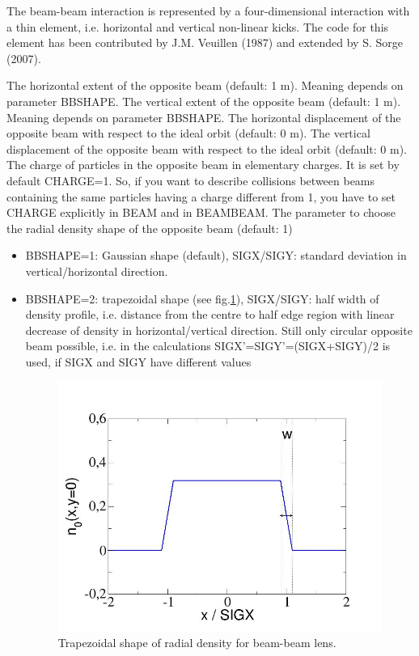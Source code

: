The beam-beam interaction is represented by a four-dimensional
interaction with a thin element, i.e. horizontal and vertical non-linear kicks.
The code for this element has been contributed by J.M. Veuillen (1987)
and extended by S. Sorge (2007).  
 
\begin{madlist}
     The horizontal extent of the opposite beam (default: 1 m).
     Meaning depends on parameter BBSHAPE.
     The vertical extent of the opposite beam (default: 1 m).
     Meaning depends on parameter BBSHAPE.
     The horizontal displacement of the opposite beam with respect to
     the ideal orbit (default: 0 m).
     The vertical displacement of the opposite beam with respect to
     the ideal orbit (default: 0 m).
     The charge of particles in the opposite beam in elementary charges. 
     It is set by default CHARGE=1. So, if you want to describe collisions 
     between beams containing the same particles having a charge different 
     from 1, you have to set CHARGE explicitly in BEAM and 
     in BEAMBEAM. 
    The parameter to choose the radial density shape of the 
     opposite beam (default: 1)
     \begin{itemize}
       \item  BBSHAPE=1: Gaussian shape (default), SIGX/SIGY: standard deviation in 
         vertical/horizontal direction.
	\item  BBSHAPE=2: trapezoidal shape (see fig.\ref{fig:beambeam_n_trapez}), 
          SIGX/SIGY: half width of density profile,
          i.e. distance from the centre to half edge region with linear decrease of 
          density in horizontal/vertical direction. Still only circular opposite beam 
          possible, i.e. in the calculations 
          SIGX'=SIGY'=(SIGX+SIGY)/2 is used, if SIGX and SIGY have
          different values 

\begin{figure}[h]
  \begin{center}
    \includegraphics[width=400px]{jpg/beambeam_n_trapez.jpg}
    \caption{Trapezoidal shape of radial density for beam-beam lens.} 
    \label{fig:beambeam_n_trapez}
  \end{center}
\end{figure}


\end{itemize}
\end{madlist}
